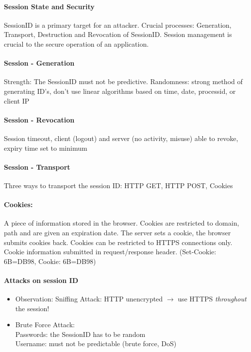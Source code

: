 \paragraph{Session State and Security}
SessionID is a primary target for an attacker. Crucial processes: Generation, Transport, Destruction and Revocation of SessionID. Session management is crucial to the secure operation of an application.


\paragraph{Session - Generation}
Strength: The SessionID must not be predictive. Randomness: strong method of generating ID's, don't use linear algorithms based on time, date, processid, or client IP

\paragraph{Session - Revocation}
Session timeout, client (logout) and server (no activity, misuse) able to revoke, expiry time set to minimum

\paragraph{Session - Transport} 
Three ways to transport the session ID: HTTP GET, HTTP POST, Cookies

\paragraph{Cookies:} A piece of information stored in the browser. Cookies are restricted to domain, path and are given an expiration date. The server sets a cookie, the browser submits cookies back. Cookies can be restricted to HTTPS connections only. Cookie information submitted in request/response header. (Set-Cookie: 6B=DB98, Cookie: 6B=DB98)

\paragraph{Attacks on session ID}
\begin{itemize}
\item Observation: Sniffing Attack: HTTP unencrypted $\to$ use HTTPS \emph{throughout} the session!
\item Brute Force Attack:\\ \quad Passwords: the SessionID has to be random \\ \quad Username: must not be predictable (brute force, DoS)
\end{itemize}

